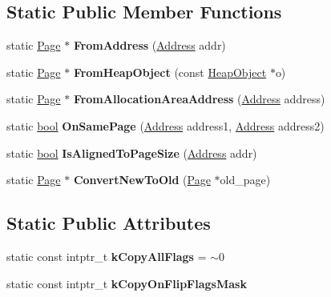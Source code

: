 \subsection*{Static Public Member Functions}
\begin{DoxyCompactItemize}
\item 
\mbox{\label{classv8_1_1internal_1_1Page_a00f1ce51248001f26fa8f18694791f63}} 
static \mbox{\hyperlink{classv8_1_1internal_1_1Page}{Page}} $\ast$ {\bfseries From\+Address} (\mbox{\hyperlink{classuintptr__t}{Address}} addr)
\item 
\mbox{\label{classv8_1_1internal_1_1Page_aa5e2914d3f6db325d76c656d4f2a45d7}} 
static \mbox{\hyperlink{classv8_1_1internal_1_1Page}{Page}} $\ast$ {\bfseries From\+Heap\+Object} (const \mbox{\hyperlink{classv8_1_1internal_1_1HeapObject}{Heap\+Object}} $\ast$o)
\item 
\mbox{\label{classv8_1_1internal_1_1Page_a4c49ccb859e100d03aaa86de9cd40528}} 
static \mbox{\hyperlink{classv8_1_1internal_1_1Page}{Page}} $\ast$ {\bfseries From\+Allocation\+Area\+Address} (\mbox{\hyperlink{classuintptr__t}{Address}} address)
\item 
\mbox{\label{classv8_1_1internal_1_1Page_a4c6bff09f59d482e543a7c4dae8a7ca7}} 
static \mbox{\hyperlink{classbool}{bool}} {\bfseries On\+Same\+Page} (\mbox{\hyperlink{classuintptr__t}{Address}} address1, \mbox{\hyperlink{classuintptr__t}{Address}} address2)
\item 
\mbox{\label{classv8_1_1internal_1_1Page_ab095f8202bcc6f6936603aa681eae2a4}} 
static \mbox{\hyperlink{classbool}{bool}} {\bfseries Is\+Aligned\+To\+Page\+Size} (\mbox{\hyperlink{classuintptr__t}{Address}} addr)
\item 
\mbox{\label{classv8_1_1internal_1_1Page_ae4ff848fbc3b29ce26c7f22b37ceabae}} 
static \mbox{\hyperlink{classv8_1_1internal_1_1Page}{Page}} $\ast$ {\bfseries Convert\+New\+To\+Old} (\mbox{\hyperlink{classv8_1_1internal_1_1Page}{Page}} $\ast$old\+\_\+page)
\end{DoxyCompactItemize}
\subsection*{Static Public Attributes}
\begin{DoxyCompactItemize}
\item 
\mbox{\label{classv8_1_1internal_1_1Page_a4706616a29ca61e97ec0885363e126a5}} 
static const intptr\+\_\+t {\bfseries k\+Copy\+All\+Flags} = $\sim$0
\item 
static const intptr\+\_\+t {\bfseries k\+Copy\+On\+Flip\+Flags\+Mask}
\end{DoxyCompactItemize}
